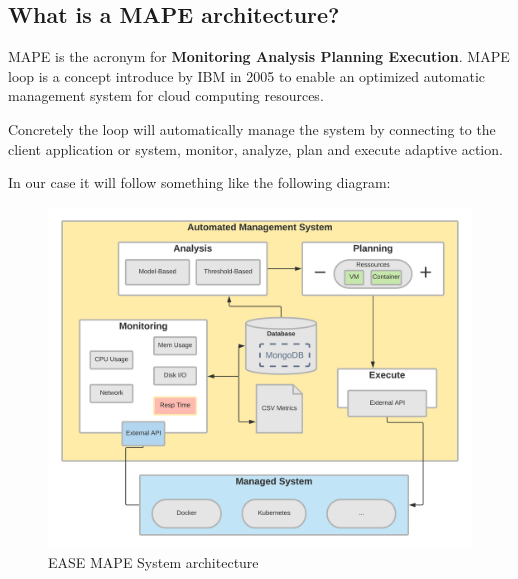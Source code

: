 \documentclass[11pt]{IEEEtran}
\begin{document}
\subsection{What is a MAPE architecture?}
MAPE is the acronym for \textbf{Monitoring Analysis Planning Execution}.
MAPE loop is a concept introduce by IBM in 2005 to enable an optimized automatic management system for cloud computing resources. 

Concretely the loop will automatically manage the system by connecting to the client application or system, monitor, analyze, plan and execute adaptive action.
 
In our case it will follow something like the following diagram:
\begin{figure}[h]
\centerline{\includegraphics[width=\linewidth]{mape_diagram.png}}
\caption{EASE MAPE System architecture}
\label{fig}
\end{figure}
\end{document}
